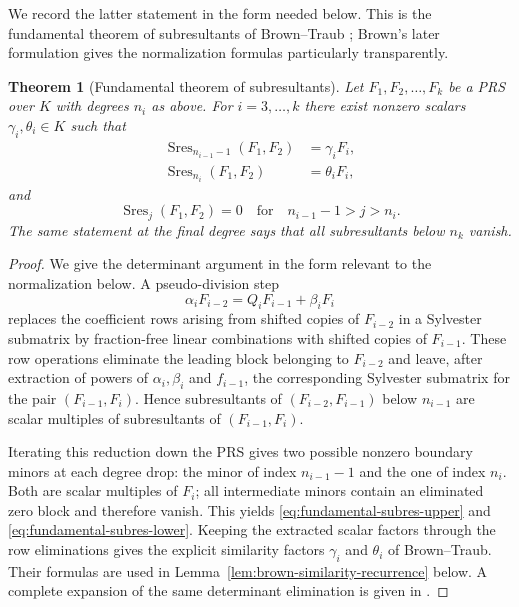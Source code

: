 \documentclass[11pt]{book}
\newtheorem{theorem}{Theorem}[section]
\theoremstyle{definition}
\begin{document}
We record the latter statement in the form needed below.  This is the
fundamental theorem of subresultants of Brown--Traub
\cite{BrownTraub1971}; Brown's later formulation \cite{Brown1978} gives the
normalization formulas particularly transparently.

\begin{theorem}[Fundamental theorem of subresultants]
\label{thm:fundamental-subresultants}
Let $F_1,F_2,\ldots,F_k$ be a PRS over $K$ with degrees $n_i$ as above.  For
$i=3,\ldots,k$ there exist nonzero scalars $\gamma_i,\theta_i\in K$ such that
\begin{align}
 \operatorname{Sres}_{n_{i-1}-1}(F_1,F_2)&=\gamma_iF_i,
 \label{eq:fundamental-subres-upper}\\
 \operatorname{Sres}_{n_i}(F_1,F_2)&=\theta_iF_i,
 \label{eq:fundamental-subres-lower}
\end{align}
and
\[
 \operatorname{Sres}_j(F_1,F_2)=0
 \quad\text{for}\quad
 n_{i-1}-1>j>n_i.
\]
The same statement at the final degree says that all subresultants below
$n_k$ vanish.
\end{theorem}

\begin{proof}
We give the determinant argument in the form relevant to the normalization
below.  A pseudo-division step
\[
 \alpha_iF_{i-2}=Q_iF_{i-1}+\beta_iF_i
\]
replaces the coefficient rows arising from shifted copies of $F_{i-2}$ in a
Sylvester submatrix by fraction-free linear combinations with shifted copies
of $F_{i-1}$.  These row operations eliminate the leading block belonging to
$F_{i-2}$ and leave, after extraction of powers of
$\alpha_i,\beta_i$ and $f_{i-1}$, the corresponding Sylvester submatrix for
the pair $(F_{i-1},F_i)$.  Hence subresultants of $(F_{i-2},F_{i-1})$ below
$n_{i-1}$ are scalar multiples of subresultants of $(F_{i-1},F_i)$.

Iterating this reduction down the PRS gives two possible nonzero boundary
minors at each degree drop: the minor of index $n_{i-1}-1$ and the one of
index $n_i$.  Both are scalar multiples of $F_i$; all intermediate minors
contain an eliminated zero block and therefore vanish.  This yields
\eqref{eq:fundamental-subres-upper} and
\eqref{eq:fundamental-subres-lower}.  Keeping the extracted scalar factors
through the row eliminations gives the explicit similarity factors
$\gamma_i$ and $\theta_i$ of Brown--Traub.  Their formulas are used in
Lemma~\ref{lem:brown-similarity-recurrence} below.  A complete expansion of
the same determinant elimination is given in
\cite{BrownTraub1971,Brown1978}.
\end{proof}
\end{document}
